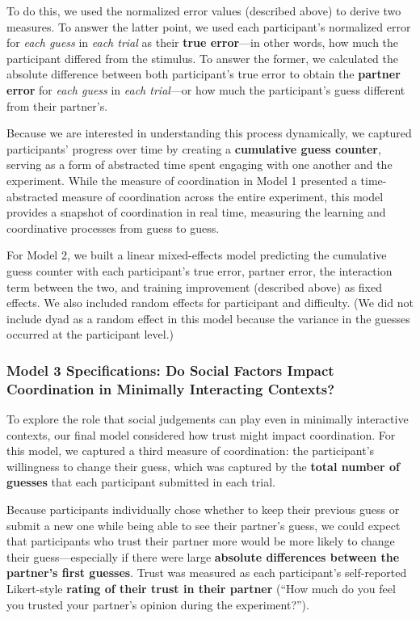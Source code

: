 \documentclass[10pt, letterpaper]{article}
\begin{document}
To do this, we used the normalized error values (described above) to
derive two measures. To answer the latter point, we used each
participant's normalized error for \emph{each guess} in \emph{each
trial} as their \textbf{true error}---in other words, how much the
participant differed from the stimulus. To answer the former, we
calculated the absolute difference between both participant's true error
to obtain the \textbf{partner error} for \emph{each guess} in \emph{each
trial}---or how much the participant's guess different from their
partner's.

Because we are interested in understanding this process dynamically, we
captured participants' progress over time by creating a
\textbf{cumulative guess counter}, serving as a form of abstracted time
spent engaging with one another and the experiment. While the measure of
coordination in Model 1 presented a time-abstracted measure of
coordination across the entire experiment, this model provides a
snapshot of coordination in real time, measuring the learning and
coordinative processes from guess to guess.

For Model 2, we built a linear mixed-effects model predicting the
cumulative guess counter with each participant's true error, partner
error, the interaction term between the two, and training improvement
(described above) as fixed effects. We also included random effects for
participant and difficulty. (We did not include dyad as a random effect
in this model because the variance in the guesses occurred at the
participant level.)

\subsubsection{Model 3 Specifications: Do Social Factors Impact
Coordination in Minimally Interacting
Contexts?}\label{model-3-specifications-do-social-factors-impact-coordination-in-minimally-interacting-contexts}

To explore the role that social judgements can play even in minimally
interactive contexts, our final model considered how trust might impact
coordination. For this model, we captured a third measure of
coordination: the participant's willingness to change their guess, which
was captured by the \textbf{total number of guesses} that each
participant submitted in each trial.

Because participants individually chose whether to keep their previous
guess or submit a new one while being able to see their partner's guess,
we could expect that participants who trust their partner more would be
more likely to change their guess---especially if there were large
\textbf{absolute differences between the partner's first guesses}. Trust
was measured as each participant's self-reported Likert-style
\textbf{rating of their trust in their partner} (``How much do you feel
you trusted your partner's opinion during the experiment?'').
\end{document}
